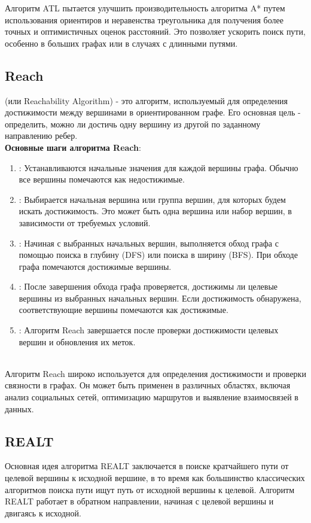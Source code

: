         Алгоритм ATL пытается улучшить производительность алгоритма A* путем использования ориентиров и неравенства треугольника для получения более точных и оптимистичных оценок расстояний. Это позволяет ускорить поиск пути, особенно в больших графах или в случаях с длинными путями.
    
    \subsection{Reach}
         (или Reachability Algorithm) - это алгоритм, используемый для определения достижимости между вершинами в ориентированном графе. Его основная цель - определить, можно ли достичь одну вершину из другой по заданному направлению ребер.\\

        \textbf{Основные шаги алгоритма Reach}:
        \begin{enumerate}
            \item {}: Устанавливаются начальные значения для каждой вершины графа. Обычно все вершины помечаются как недостижимые.
            \item {}: Выбирается начальная вершина или группа вершин, для которых будем искать достижимость. Это может быть одна вершина или набор вершин, в зависимости от требуемых условий.
            \item {}: Начиная с выбранных начальных вершин, выполняется обход графа с помощью поиска в глубину (DFS) или поиска в ширину (BFS). При обходе графа помечаются достижимые вершины.
            \item {}: После завершения обхода графа проверяется, достижимы ли целевые вершины из выбранных начальных вершин. Если достижимость обнаружена, соответствующие вершины помечаются как достижимые.
            \item {}: Алгоритм Reach завершается после проверки достижимости целевых вершин и обновления их меток.
        \end{enumerate}\\

        Алгоритм Reach широко используется для определения достижимости и проверки связности в графах. Он может быть применен в различных областях, включая анализ социальных сетей, оптимизацию маршрутов и выявление взаимосвязей в данных.
    
    \subsection{REALT}
        Основная идея алгоритма REALT заключается в поиске кратчайшего пути от целевой вершины к исходной вершине, в то время как большинство классических алгоритмов поиска пути ищут путь от исходной вершины к целевой. Алгоритм REALT работает в обратном направлении, начиная с целевой вершины и двигаясь к исходной.\\

